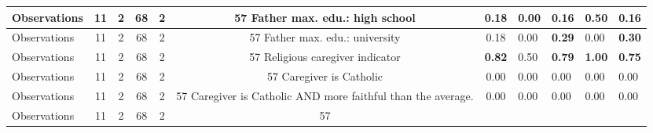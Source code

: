 \begin{tabular}{l c c c c c c }
Observations &        11 &         2 &        68 &         2 &        57
Father max. edu.: high school &      0.18 &      0.00 &      0.16 &      0.50 &      0.16 \\
\midrule
Observations &        11 &         2 &        68 &         2 &        57
Father max. edu.: university &      0.18 &      0.00 & \textbf{     0.29} &      0.00 & \textbf{     0.30} \\
\midrule
Observations &        11 &         2 &        68 &         2 &        57
Religious caregiver indicator & \textbf{     0.82} &      0.50 & \textbf{     0.79} & \textbf{     1.00} & \textbf{     0.75} \\
\midrule
Observations &        11 &         2 &        68 &         2 &        57
Caregiver is Catholic &      0.00 &      0.00 &      0.00 &      0.00 &      0.00 \\
\midrule
Observations &        11 &         2 &        68 &         2 &        57
Caregiver is Catholic AND more faithful than the average. &      0.00 &      0.00 &      0.00 &      0.00 &      0.00 \\
\midrule
Observations &        11 &         2 &        68 &         2 &        57
\bottomrule
\end{tabular}
